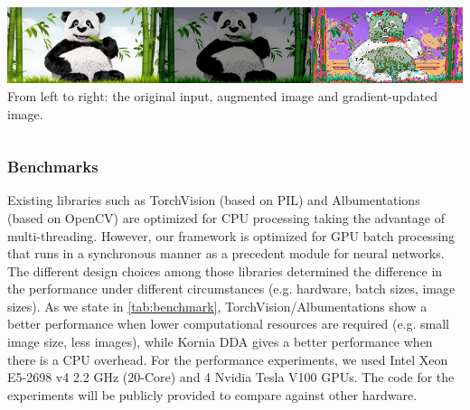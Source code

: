 \begin{tcolorbox}[every float=\centering, drop shadow, title=Example 2: Optimizable DA]
    \label{fig:examples:optimize}
    \inputminted[python3, baselinestretch=1., style=vs, fontfamily=courier, fontsize=\footnotesize, funcnamehighlighting=true]{python}{main/chapter03/data/dda/code/exp2_color_jitter_differentiable.py}
    \includegraphics[width=1.\linewidth]{main/chapter03/data/dda/imgs/exp2_demo.png}
    From left to right: the original input, augmented image and gradient-updated image.
    \inputminted[python3, baselinestretch=1., style=vs, fontfamily=courier, fontsize=\footnotesize, funcnamehighlighting=true]{python}{main/chapter03/data/dda/code/exp2_color_jitter_out.py}
\end{tcolorbox}

\subsubsection{Benchmarks}

Existing libraries such as TorchVision (based on PIL) and Albumentations~\cite{info11020125} (based on OpenCV) are optimized for CPU processing taking the advantage of multi-threading. However, our framework is optimized for GPU batch processing that runs in a synchronous manner as a precedent module for neural networks. The different design choices among those libraries determined the difference in the performance under different circumstances (e.g. hardware, batch sizes, image sizes). As we state in \autoref{tab:benchmark}, TorchVision/Albumentations show a better performance when lower computational resources are required (e.g. small image size, less images), while Kornia DDA gives a better performance when there is a CPU overhead. For the performance experiments, we used Intel Xeon E5-2698 v4 2.2 GHz (20-Core) and 4 Nvidia Tesla V100 GPUs. The code for the experiments will be publicly provided to compare against other hardware.

